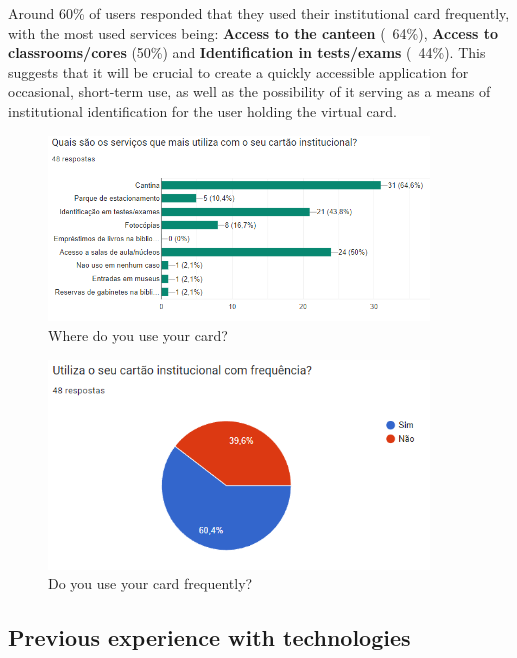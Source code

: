 \documentclass{article}
\begin{document}
Around 60\% of users responded that they used their institutional card frequently, with the most used services being: \textbf{Access to the canteen} (~64\%), \textbf{Access to classrooms/cores} (50\%) and \textbf{Identification in tests/exams} (~44\%).
This suggests that it will be crucial to create a quickly accessible application for occasional, short-term use, as well as the possibility of it serving as a means of institutional identification for the user holding the virtual card.

\begin{figure}[h]
    \centering
    \includegraphics[width=0.9\textwidth]{images/questionaire2.png}
    \caption{Where do you use your card?}
\end{figure}

\begin{figure}[h]
    \centering
    \includegraphics[width=0.9\textwidth]{images/questionaire3.png}
    \caption{Do you use your card frequently?}
\end{figure}

\subsection{Previous experience with technologies}
\end{document}
